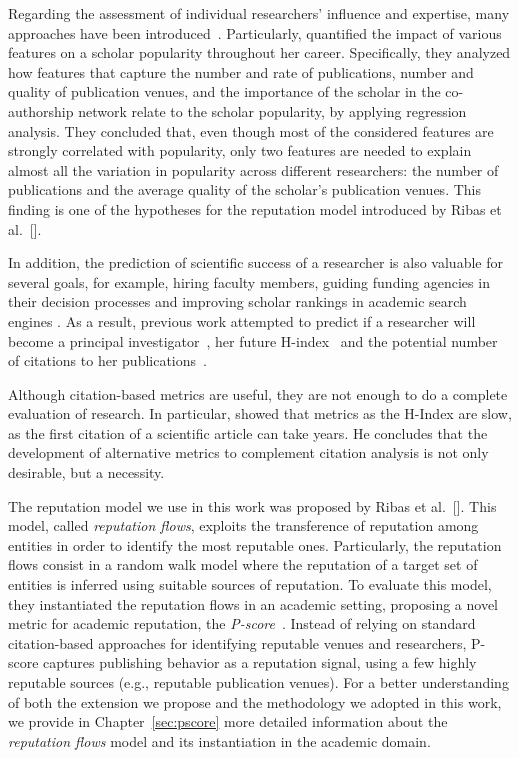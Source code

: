 \documentclass[msc]{ppgccufmg}
\begin{document}
Regarding the assessment of individual researchers' influence and expertise, many approaches have been introduced~\citep{balog2012ftir, cormode2014people, deng2012modeling, gollapalli2011ranking, wu2009detecting}. Particularly, \cite{goncalves2014} quantified the impact of various features on a scholar popularity throughout her career. Specifically, they analyzed how features that capture the number and rate of publications, number and quality of publication venues, and the importance of the scholar in the co-authorship network relate to the scholar popularity, by applying regression analysis. They concluded that, even though most of the considered features are strongly correlated with popularity, only two features are needed to explain almost all the variation in popularity across different researchers: the number of publications and the average quality of the scholar’s publication venues. This finding is one of the hypotheses for the reputation model introduced by Ribas et al.~[\citeyear{ribas2015random}]. 

In addition, the prediction of scientific success of a researcher is also valuable for several goals, for example, hiring faculty members, guiding funding agencies in their decision processes and improving scholar rankings in academic search engines \citep{masoumeh16}. As a result, previous work attempted to predict if a researcher will become a principal investigator~\citep{vandijk14}, her future H-index~\citep{dong15, penner13} and the potential number of citations to her publications~\citep{castillo2007estimating,mazloumian12}.

Although citation-based metrics are useful, they are not enough to do a complete evaluation of research.  In particular, \cite{piwowar2013altmetrics} showed that metrics as the H-Index are slow, as the first citation of a scientific article can take years. He concludes that the development of alternative metrics to complement citation analysis is not only desirable, but a necessity.

The reputation model we use in this work was proposed by Ribas et al.~[\citeyear{ribas2015random}]. This model, called \textit{reputation flows}, exploits the transference of reputation among entities in order to identify the most reputable ones. Particularly, the reputation flows consist in a random walk model where the reputation of a target set of entities is inferred using suitable sources of reputation. To evaluate this model, they instantiated the reputation flows in an academic setting, proposing a novel metric for academic reputation, the \textit{P-score}~\citep{ribas2015bigscholar}. Instead of relying on standard citation-based approaches for identifying reputable venues and researchers, P-score captures publishing behavior as a reputation signal, using a few highly reputable sources (e.g., reputable publication venues). For a better understanding of both the extension we propose and the methodology we adopted in this work, we provide in Chapter~\ref{sec:pscore} more detailed information about the \textit{reputation flows} model and its instantiation in the academic domain. 
\end{document}

